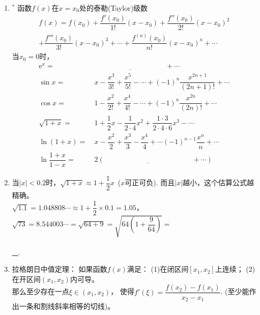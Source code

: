\documentclass{article}
\newif\ifte
\newcommand{\e}{\mathrm{e}}
\begin{document}
\begin{multicols}{2}
\begin{enumerate}[leftmargin=20pt]
\item $^*$ 函数$ f(x) $在$ x=x_0 $处的泰勒(Taylor)级数
\begin{gather*}
    f(x)=f(x_0)+\dfrac{f'(x_0)}{1!}(x-x_0)+\dfrac{f''(x_0)}{2!}
    (x-x_0)^2\\ + \dfrac{f'''(x_0)}{3!}(x-x_0)^3+\cdots+
    \dfrac{f^{(n)}(x_0)}{n!}(x-x_0)^n+\cdots
\end{gather*}
当$ x_0=0 $时，
\begin{align*}
    \e^x=&\ \underline{\ \ifte 1+x+\dfrac{x^2}{2!}+\cdots
        +\dfrac{x^n}{n!}\else \hspace{4cm} \fi\ }+\cdots \\
    \sin x=&\ x-\dfrac{x^3}{3!}+\dfrac{x^5}{5!}-\cdots +(-1)^n
    \dfrac{x^{2n+1}}{(2n+1)!} +\cdots \\
    \cos x=&\ 1-\dfrac{x^2}{2!}+\dfrac{x^4}{4!}-\cdots +(-1)^n
    \dfrac{x^{2n}}{(2n)!} +\cdots \\
    \sqrt{1+x}=&\ 1+\dfrac{1}{2}x-\dfrac{1}{2\cdot 4}x^2
    +\dfrac{1\cdot 3}{2\cdot 4\cdot 6}x^3-\cdots \\
    \ln(1+x)=&\ x-\dfrac{x^2}{2}+\dfrac{x^3}{3}-\dfrac{x^4}{4}+
    \cdots (-1)^{n-1}\dfrac{x^n}{n}+ \cdots \\
    \ln\dfrac{1+x}{1-x}=&\ 2\left(\underline{\ \ifte 
    x+\dfrac{x^3}{3}+\dfrac{x^5}{5}+\cdots +
    \dfrac{x^{2n-1}}{2n-1}\else \hspace{5cm} \fi\ } +\cdots \right)
\end{align*} 

\item 当$ |x| < 0.2 $时，$ \sqrt{1+x}\approx 1+\dfrac{1}{2}x $\ ($ x $可正可负).
而且$ |x| $越小，这个估算公式越精确。\\
$ \sqrt{1.1}=1.048808\cdots \approx 1+\dfrac{1}{2}\times 0.1=1.05 $，\\
$ \sqrt{73}=8.544003\cdots=\sqrt{64+9}=\sqrt{64\left(1+\dfrac{9}{64}\right)}=$
\ifte \underline{\ $ 8\sqrt{1+\dfrac{9}{64}}\approx 8\left(1+
\dfrac{9}{2\times 64}\right)=8+\dfrac{9}{2\times 8}=8\dfrac{9}{16} $}
\else\\ \\ \underline{\ \hspace{8cm} }\fi .

\item 拉格朗日中值定理： 如果函数$ f(x) $满足：
(1)在闭区间$ [x_1,x_2] $上连续；
(2)在开区间$ (x_1,x_2) $内可导。\\
那么至少存在一点$ \xi\in(x_1,x_2) $，
使得$ f'(\xi)=\dfrac{f(x_2)-f(x_1)}{x_2-x_1} $.
(至少能作出一条和割线斜率相等的切线)。 


\end{enumerate}
\end{multicols}
\end{document}
